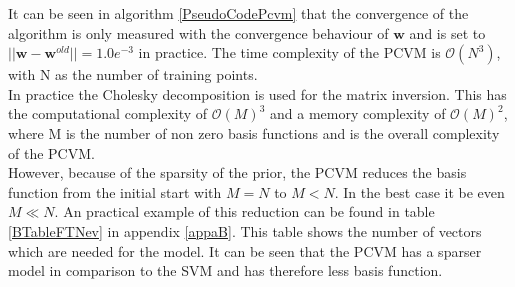 It can be seen in algorithm \ref{PseudoCodePcvm} that the convergence of the algorithm is only measured with the convergence behaviour of $\mathbf{w}$ and is set to $||{\mathbf{w}-\mathbf{w}^{old}}|| = 1.0e^{-3}$ in practice. 
The time complexity of the \acs{PCVM} is $\mathcal{O}(N^3)$, with N as the number of training points.\\
In practice the Cholesky decomposition is used for the matrix inversion. 
This has the computational complexity of $\mathcal{O}(M)^3$ and a memory complexity of $\mathcal{O}(M)^2$, where M is the number of non zero basis functions and is the overall complexity of the \acs{PCVM}.\cite{Chen.2009}\\
However, because of the sparsity of the prior, the \acs{PCVM} reduces the basis function from the initial start with $M = N$ to $M < N$.
In the best case it be even $M \ll N$.
An practical example of this reduction can be found in table \ref{BTableFTNev} in appendix \ref{appaB}. 
This table shows the number of vectors which are needed for the model. 
It can be seen that the \acs{PCVM} has a sparser model in comparison to the \acs{SVM} and has therefore less basis function.

